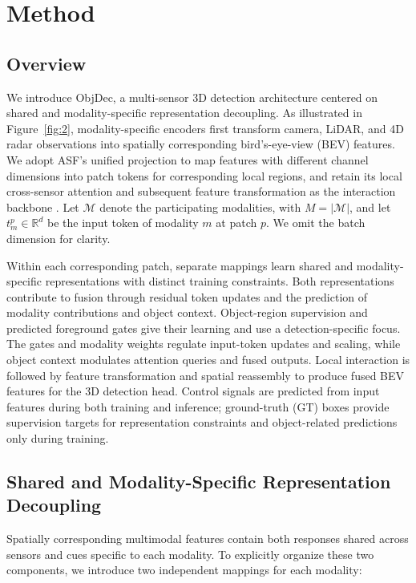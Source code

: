 \section{Method}\label{sec:methods}

\subsection{Overview}
\label{subsec:31}

We introduce ObjDec, a multi-sensor 3D detection architecture centered on shared and modality-specific representation decoupling. As illustrated in Figure~\ref{fig:2}, modality-specific encoders first transform camera, LiDAR, and 4D radar observations into spatially corresponding bird's-eye-view (BEV) features. We adopt ASF's unified projection to map features with different channel dimensions into patch tokens for corresponding local regions, and retain its local cross-sensor attention and subsequent feature transformation as the interaction backbone \citep{paek2025asf}. Let \(\mathcal M\) denote the participating modalities, with \(M=|\mathcal M|\), and let \(t_m^p\in\mathbb R^d\) be the input token of modality \(m\) at patch \(p\). We omit the batch dimension for clarity.

Within each corresponding patch, separate mappings learn shared and modality-specific representations with distinct training constraints. Both representations contribute to fusion through residual token updates and the prediction of modality contributions and object context. Object-region supervision and predicted foreground gates give their learning and use a detection-specific focus. The gates and modality weights regulate input-token updates and scaling, while object context modulates attention queries and fused outputs. Local interaction is followed by feature transformation and spatial reassembly to produce fused BEV features for the 3D detection head. Control signals are predicted from input features during both training and inference; ground-truth (GT) boxes provide supervision targets for representation constraints and object-related predictions only during training.


\subsection{Shared and Modality-Specific Representation Decoupling}
\label{subsec:32}

Spatially corresponding multimodal features contain both responses shared across sensors and cues specific to each modality. To explicitly organize these two components, we introduce two independent mappings for each modality:


